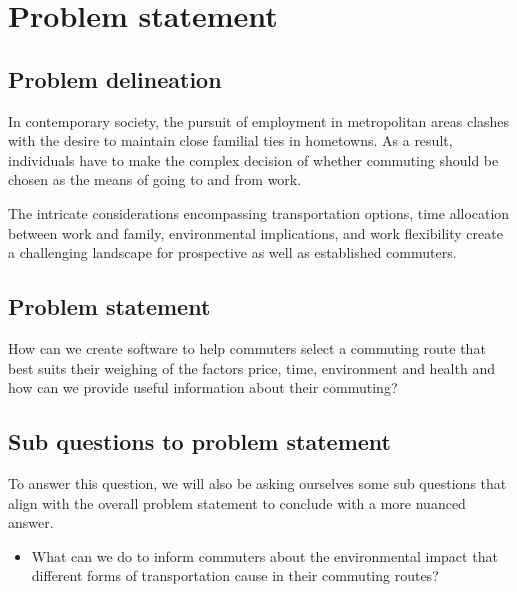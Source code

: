 \chapter{Problem statement}\label{ch:problem-statement}

\section{Problem delineation}\label{sec:problem-delineation}

In contemporary society, the pursuit of employment in metropolitan areas clashes with the desire to maintain close
familial ties in hometowns.
As a result, individuals have to make the complex decision of whether commuting should be chosen as the means of
going to and from work.

The intricate considerations encompassing transportation options, time allocation between work and family, environmental
implications, and work flexibility create a challenging landscape for prospective as well as established commuters.

\section{Problem statement}\label{sec:problem-statement}

How can we create software to help commuters select a commuting route that best suits their weighing of the factors
price, time, environment and health and how can we provide useful information about their commuting?

\section{Sub questions to problem statement}\label{sec:sub-questions-to-problem-statement}

To answer this question, we will also be asking ourselves some sub questions that align with the overall problem
statement to conclude with a more nuanced answer.

\begin{itemize}
    \item What can we do to inform commuters about the environmental impact that different forms of transportation
    cause in their commuting routes?
\end{itemize}

